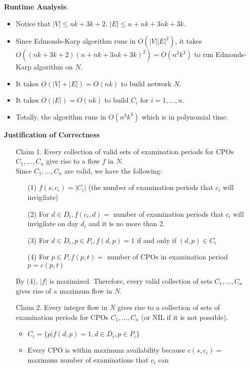 \documentclass[11pt]{article}
\begin{document}
{\bf Runtime Analysis}:
\begin{itemize}
\item Notice that $|V| \leq nk+3k+2$. $|E|  \leq n + nk + 3nk+3k$.
\item Since Edmonds-Karp algorithm runs in $O(|V||E|^2)$, it takes $O((nk+3k+2)(n + nk + 3nk+3k)^2)=O(n^3k^3)$ to run Edmonds-Karp algorithm on $N$.
\item It takes $O(|V| + |E|)= O(nk)$ to build network $N$.
\item It takes $O(|E|)=O(nk)$ to build $C_i$ for $i = 1, ..., n$.
\item Totally, the algorithm runs in $O(n^3k^3)$ which is in polynomial time.
\end{itemize}
{\bf Justification of Correctness}
\begin{enumerate}
\item[Claim 1.] Every collection of valid sets of examination periods for CPOs $C_1, ..., C_n$ give rise to a flow $f$ in $N$.\\
                Since $C_1, ..., C_n$ are valid, we have the following:
                \begin{itemize}
                \item[(1)]
                    $f(s, c_i) = |C_i|$  (the number of examination periods that $c_i$ will invigilate)
                \item[(2)]
                    For $d\in D_i, f(c_i, d) =$ number of examination periods that $c_i$ will invigilate on day $d_i$ and it is no more than 2.
                \item[(3)]
                    For $d\in D_i, p\in P_i, f(d, p)=1$ if and only if $(d, p) \in C_i$
                \item[(4)]
                    For $p\in P, f(p, t) =$ number of CPOs in examination period $p = c(p, t)$ 
                \end{itemize}
                By (4), $|f|$ is maximized. Therefore, every valid collection of sets $C_1, ..., C_n$  gives rise of a maximum flow in $N$.
\item[Claim 2.] Every integer flow in $N$ gives rise to a collection of sets of examination periods for CPOs $C_1, ..., C_n$ (or NIL if it is not possible).
                \begin{itemize}
                \item
                    $C_i = \{p|f(d, p)=1, d \in D_i, p\in P_i\}$
                \item
                    Every CPO is within maximum availability because $c(s, c_i)=$ maximum number of examinations that $c_i$ can

\end{itemize}
\end{enumerate}
\end{document}

